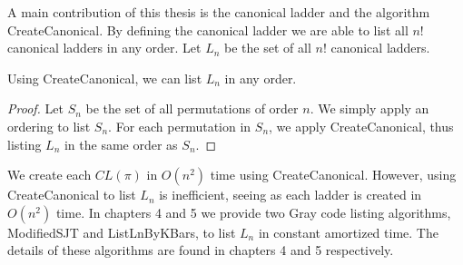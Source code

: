 A main contribution of this thesis is the canonical ladder and the algorithm {\sc CreateCanonical}.
By defining the canonical ladder we are able to list all $n!$ canonical ladders in any order. 
Let $L_{n}$ be the set of all $n!$ canonical ladders. 
\begin{lemma}
    Using {\sc CreateCanonical}, we can list $L_{n}$ in any order.
\end{lemma}
\begin{proof}
 Let $S_{n}$ be the set of all permutations of order $n$. We simply apply an ordering to list $S_{n}$. For each 
 permutation in $S_{n}$, we apply {\sc CreateCanonical}, thus listing $L_{n}$ in the same order as $S_{n}$.
\end{proof}
We create each $CL(\pi)$ in $O(n^2)$ time using {\sc CreateCanonical}. However, using {\sc CreateCanonical} to list $L_{n}$ is inefficient, 
seeing as each ladder is created in $O(n^2)$ time. 
In chapters 4 and 5 we provide two Gray code listing algorithms, {\sc ModifiedSJT} and {\sc ListLnByKBars}, to list $L_{n}$ in constant amortized time. 
The details of these algorithms are found in chapters 4 and 5 respectively.  





